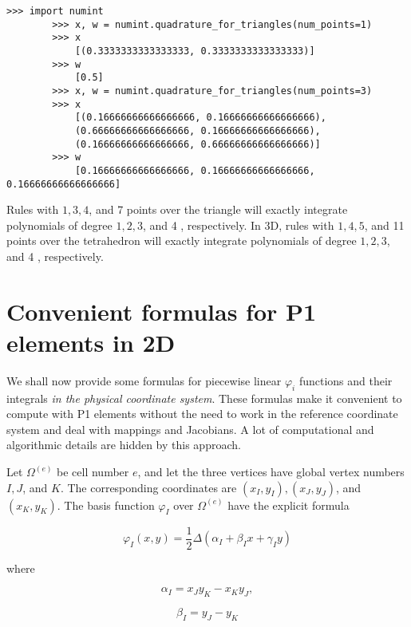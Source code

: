 \documentclass[../main.tex]{subfiles}
\begin{document}
		\begin{lstlisting}[numbers=none]
		>>> import numint
		>>> x, w = numint.quadrature_for_triangles(num_points=1)
		>>> x
			[(0.3333333333333333, 0.3333333333333333)]
		>>> w
			[0.5]
		>>> x, w = numint.quadrature_for_triangles(num_points=3)
		>>> x
			[(0.16666666666666666, 0.16666666666666666),
			(0.66666666666666666, 0.16666666666666666),
			(0.16666666666666666, 0.66666666666666666)]
		>>> w
			[0.16666666666666666, 0.16666666666666666, 0.16666666666666666]
		\end{lstlisting}
		Rules with $1,3,4$, and 7 points over the triangle will exactly integrate polynomials of degree $1,2,3$, and 4 , respectively. In $3 \mathrm{D}$, rules with $1,4,5$, and 11 points over the tetrahedron will exactly integrate polynomials of degree $1,2,3$, and 4 , respectively. \bigbreak
		
	\section[Convenient formulas for P1 elements in 2D]{Convenient formulas for P1 elements in 2D}
	\label{sec:sec_17_3}
	\noindent We shall now provide some formulas for piecewise linear $\varphi_{i}$ functions and their integrals \emph{in the physical coordinate system}. These formulas make it convenient to compute with P1 elements without the need to work in the reference coordinate system and deal with mappings and Jacobians. A lot of computational and algorithmic details are hidden by this approach.
	
	Let $\Omega^{(e)}$ be cell number $e$, and let the three vertices have global vertex numbers $I, J$, and $K$. The corresponding coordinates are $\left(x_{I}, y_{I}\right),\left(x_{J}, y_{J}\right)$, and $\left(x_{K}, y_{K}\right)$. The basis function $\varphi_{I}$ over $\Omega^{(e)}$ have the explicit formula
	
	\begin{equation}
		\label{eqa205}
		\varphi_{I}(x, y)=\frac{1}{2} \Delta\left(\alpha_{I}+\beta_{I} x+\gamma_{I} y\right)
	\end{equation}

	\noindent where
	
	\begin{equation}
		\label{eqa206}
			\alpha_{I} =x_{J} y_{K}-x_{K} y_{J}, 
	\end{equation}

	\begin{equation}
		\label{eqa207}
			\beta_{I} =y_{J}-y_{K}
	\end{equation}
\end{document}
